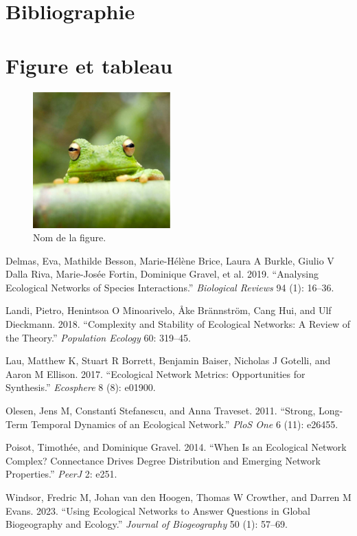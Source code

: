 \documentclass[9pt,twocolumn,twoside,]{pnas-new}
\newlength{\cslhangindent}
\newlength{\cslentryspacingunit} %
\newenvironment{CSLReferences}[2] %
 {%
  \setlength{\parindent}{0pt}
  \ifodd #1
  \let\oldpar\par
  \def\par{\hangindent=\cslhangindent\oldpar}
  \fi
  \setlength{\parskip}{#2\cslentryspacingunit}
 }%
 {}
\begin{document}
\hypertarget{bibliographie}{%
\section{Bibliographie}\label{bibliographie}}

\hypertarget{figure-et-tableau}{%
\section{Figure et tableau}\label{figure-et-tableau}}

\begin{figure}
\centering
\includegraphics{frog.png}
\caption{Nom de la figure.}
\end{figure}

\hypertarget{refs}{}
\begin{CSLReferences}{1}{0}
\leavevmode{}%
Delmas, Eva, Mathilde Besson, Marie-Hélène Brice, Laura A Burkle, Giulio
V Dalla Riva, Marie-Josée Fortin, Dominique Gravel, et al. 2019.
{``Analysing Ecological Networks of Species Interactions.''}
\emph{Biological Reviews} 94 (1): 16--36.

\leavevmode{}%
Landi, Pietro, Henintsoa O Minoarivelo, Åke Brännström, Cang Hui, and
Ulf Dieckmann. 2018. {``Complexity and Stability of Ecological Networks:
A Review of the Theory.''} \emph{Population Ecology} 60: 319--45.

\leavevmode{}%
Lau, Matthew K, Stuart R Borrett, Benjamin Baiser, Nicholas J Gotelli,
and Aaron M Ellison. 2017. {``Ecological Network Metrics: Opportunities
for Synthesis.''} \emph{Ecosphere} 8 (8): e01900.

\leavevmode{}%
Olesen, Jens M, Constantı́ Stefanescu, and Anna Traveset. 2011.
{``Strong, Long-Term Temporal Dynamics of an Ecological Network.''}
\emph{PloS One} 6 (11): e26455.

\leavevmode{}%
Poisot, Timothée, and Dominique Gravel. 2014. {``When Is an Ecological
Network Complex? Connectance Drives Degree Distribution and Emerging
Network Properties.''} \emph{PeerJ} 2: e251.

\leavevmode{}%
Windsor, Fredric M, Johan van den Hoogen, Thomas W Crowther, and Darren
M Evans. 2023. {``Using Ecological Networks to Answer Questions in
Global Biogeography and Ecology.''} \emph{Journal of Biogeography} 50
(1): 57--69.

\end{CSLReferences}



% 
\end{document}
